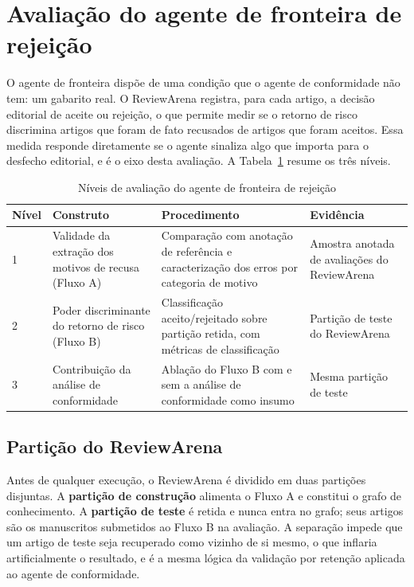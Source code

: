 \section{Avaliação do agente de fronteira de rejeição}
\label{sec:avaliacao-fronteira}

O agente de fronteira dispõe de uma condição que o agente de conformidade não tem: um gabarito real. O ReviewArena registra, para cada artigo, a decisão editorial de aceite ou rejeição, o que permite medir se o retorno de risco discrimina artigos que foram de fato recusados de artigos que foram aceitos. Essa medida responde diretamente se o agente sinaliza algo que importa para o desfecho editorial, e é o eixo desta avaliação. A Tabela~\ref{tab:niveis-fronteira} resume os três níveis.

\begin{table}[H]
\centering
\caption{Níveis de avaliação do agente de fronteira de rejeição}
\label{tab:niveis-fronteira}
\small
\begin{tabular}{|p{1.0cm}|p{3.4cm}|p{5.4cm}|p{3.5cm}|}
\hline
\textbf{Nível} & \textbf{Construto} & \textbf{Procedimento} & \textbf{Evidência} \\
\hline
1 & Validade da extração dos motivos de recusa (Fluxo A) & Comparação com anotação de referência e caracterização dos erros por categoria de motivo & Amostra anotada de avaliações do ReviewArena \\
\hline
2 & Poder discriminante do retorno de risco (Fluxo B) & Classificação aceito/rejeitado sobre partição retida, com métricas de classificação & Partição de teste do ReviewArena \\
\hline
3 & Contribuição da análise de conformidade & Ablação do Fluxo B com e sem a análise de conformidade como insumo & Mesma partição de teste \\
\hline
\end{tabular}
\end{table}

\subsection{Partição do ReviewArena}
\label{sec:particao}

Antes de qualquer execução, o ReviewArena é dividido em duas partições disjuntas. A \textbf{partição de construção} alimenta o Fluxo A e constitui o grafo de conhecimento. A \textbf{partição de teste} é retida e nunca entra no grafo; seus artigos são os manuscritos submetidos ao Fluxo B na avaliação. A separação impede que um artigo de teste seja recuperado como vizinho de si mesmo, o que inflaria artificialmente o resultado, e é a mesma lógica da validação por retenção aplicada ao agente de conformidade.

